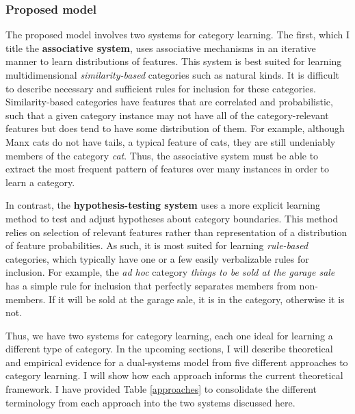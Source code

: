 \documentclass[../dissertation.tex]{subfiles}
\begin{document}
\subsubsection{Proposed model}
	The proposed model involves two systems for category learning. The first, which I title the \textbf{associative system}, uses associative mechanisms in an iterative manner to learn distributions of features. This system is best suited for learning multidimensional \textit{similarity-based} categories such as natural kinds. It is difficult to describe necessary and sufficient rules for inclusion for these categories. Similarity-based categories have features that are correlated and probabilistic, such that a given category instance may not have all of the category-relevant features but does tend to have some distribution of them. For example, although Manx cats do not have tails, a typical feature of cats, they are still undeniably members of the category \textit{cat}. Thus, the associative system must be able to extract the most frequent pattern of features over many instances in order to learn a category. \par
	In contrast, the \textbf{hypothesis-testing system} uses a more explicit learning method to test and adjust hypotheses about category boundaries. This method relies on selection of relevant features rather than representation of a distribution of feature probabilities. As such, it is most suited for learning \textit{rule-based} categories, which typically have one or a few easily verbalizable rules for inclusion. For example, the \textit{ad hoc} category \textit{things to be sold at the garage sale} has a simple rule for inclusion that perfectly separates members from non-members.  If it will be sold at the garage sale, it is in the category, otherwise it is not. \par
	Thus, we have two systems for category learning, each one ideal for learning a different type of category. In the upcoming sections, I will describe theoretical and empirical evidence for a dual-systems model from five different approaches to category learning. I will show how each approach informs the current theoretical framework. I have provided Table \ref{approaches} to consolidate the different terminology from each approach into the two systems discussed here.
	
\end{document}
